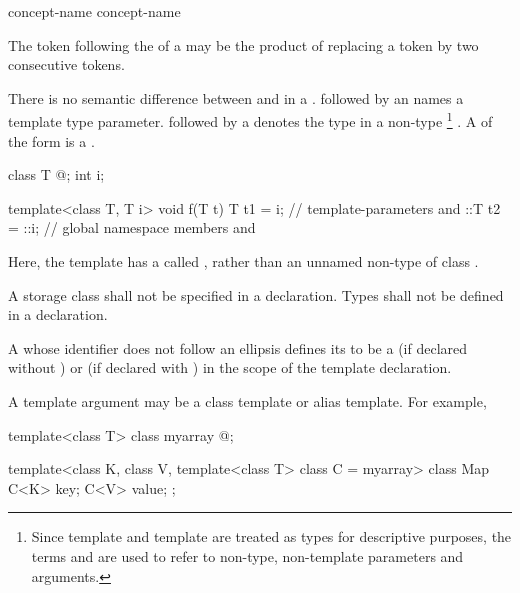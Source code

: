 \begin{bnf}
\br
  \br
\end{bnf}

\begin{bnf}
\br
   concept-name\br
   concept-name \terminal{<}  \terminal{>}
\end{bnf}

\begin{note}
The \tcode{>} token following the
 of a
may be the product of replacing a
\tcode{>{>}} token by two consecutive \tcode{>}
tokens.
\end{note}

\pnum
There is no semantic difference between
and
in a
.
followed by an
names a template type parameter.
followed by a
denotes the type in a non-type%
\footnote{Since template
and template
are treated as types for descriptive purposes, the terms
and
are used to refer to non-type, non-template parameters and arguments.}
.
A  of the form
  is a .
\begin{example}
\begin{codeblock}
class T { @\commentellip@ };
int i;

template<class T, T i> void f(T t) {
  T t1 = i;         // template-parameters  and 
  ::T t2 = ::i;     // global namespace members  and 
}
\end{codeblock}
Here, the template  has a 
called , rather than an unnamed non-type
 of class .
\end{example}
A storage class shall not be specified in a
declaration.
Types shall not be defined in a 
declaration.

\pnum
A
whose identifier does not follow an ellipsis
defines its
to be a
(if declared without
)
or
(if declared with
)
in the scope of the template declaration.
\begin{note}
A template argument may be a class template or alias template.
For example,

\begin{codeblock}
template<class T> class myarray { @\commentellip@ };

template<class K, class V, template<class T> class C = myarray>
class Map {
  C<K> key;
  C<V> value;
};
\end{codeblock}
\end{note}

